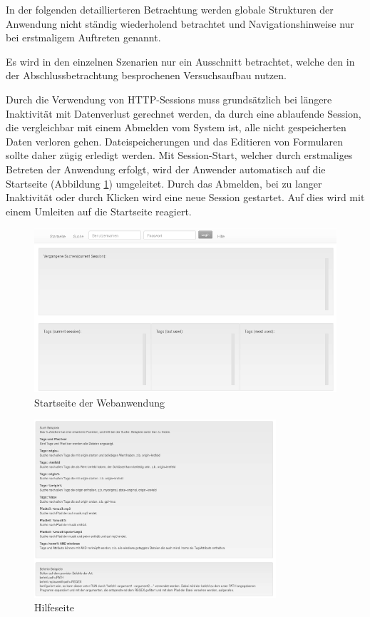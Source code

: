 \documentclass[oneside, ngerman, toc=bibliography,bibliography=totoc,listof=entryprefix, open=right,numbers=noenddot,fontsize=12pt]{scrbook}
\begin{document}
In der folgenden detaillierteren Betrachtung werden globale Strukturen der Anwendung nicht ständig wiederholend betrachtet und Navigationshinweise nur bei erstmaligem Auftreten genannt.

Es wird in den einzelnen Szenarien nur ein Ausschnitt betrachtet, welche den in der Abschlussbetrachtung besprochenen Versuchsaufbau nutzen.

Durch die Verwendung von HTTP-Sessions muss grundsätzlich bei längere Inaktivität mit Datenverlust gerechnet werden, da durch eine ablaufende Session, die vergleichbar mit einem Abmelden vom System ist, alle nicht gespeicherten Daten verloren gehen.
Dateispeicherungen und das Editieren von Formularen sollte daher zügig erledigt werden. Mit Session-Start, welcher durch erstmaliges Betreten der Anwendung erfolgt,  wird der Anwender automatisch auf die Startseite (Abbildung \ref{fig:www-start}) umgeleitet. Durch das Abmelden, bei zu langer Inaktivität oder durch Klicken wird eine neue Session gestartet. Auf dies wird mit einem Umleiten auf die Startseite reagiert.


\begin{figure}[htbp] 
    \centering
    \includegraphics[width=\textwidth]{Masterarbeit_Bilder/www_startseite.png}
    \caption{Startseite der Webanwendung}
    \label{fig:www-start}
\end{figure}  



\begin{figure}[htbp] 
    \centering
    \includegraphics[width=0.8\textwidth]{Masterarbeit_Bilder/www_help.png}
    \caption{Hilfeseite}
    \label{fig:www-help}
\end{figure}  
\end{document}
